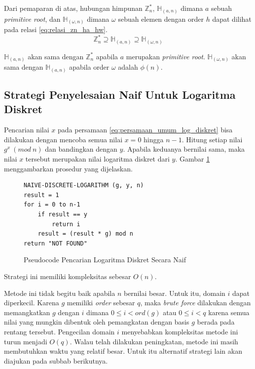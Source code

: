 Dari pemaparan di atas, hubungan himpunan $ \mathbb{Z}_n^* $, $ \mathbb{H}_{(a, n)} $ dimana $ a $ sebuah \textit{primitive root}, dan $ \mathbb{H}_{(\omega, n)} $ dimana $ \omega $ sebuah elemen dengan order $ h $ dapat dilihat pada relasi \eqref{eq:relasi_zn_ha_hw}.
\begin{equation}
\mathbb{Z}_n^*\supseteq \mathbb{H}_{(a, n)} \supseteq \mathbb{H}_{(\omega, n)}
\label{eq:relasi_zn_ha_hw}
\end{equation}

$ \mathbb{H}_{(a, n)} $ akan sama dengan $ \mathbb{Z}_n^* $ apabila $ a $ merupakan \textit{primitive root}. $ \mathbb{H}_{(\omega, n)} $ akan sama dengan $ \mathbb{H}_{(a, n)} $ apabila order $ {\omega} $ adalah $ \phi(n) $.

\subsection{Strategi Penyelesaian Naif Untuk Logaritma Diskret}
Pencarian nilai $ x $ pada persamaan \eqref{eq:persamaan_umum_log_diskret} bisa dilakukan dengan mencoba semua nilai $ x = 0 $ hingga $ n-1 $. Hitung setiap nilai $ g^x\ (mod\ n) $ dan bandingkan dengan $ y $. Apabila keduanya bernilai sama, maka nilai $ x $ tersebut merupakan nilai logaritma diskret dari $ y $. Gambar \ref{psdo:disc_log_naive} menggambarkan prosedur yang dijelaskan.
\begin{figure}[h!]
\begin{lstlisting}[firstnumber=0]
NAIVE-DISCRETE-LOGARITHM (g, y, n)
result = 1
for i = 0 to n-1
	if result == y
		return i
	result = (result * g) mod n
return "NOT FOUND"
\end{lstlisting}
\caption{Pseudocode Pencarian Logaritma Diskret Secara Naif}
\label{psdo:disc_log_naive}
\end{figure}
Strategi ini memiliki kompleksitas sebesar $ O(n) $.

Metode ini tidak begitu baik apabila $ n $ bernilai besar. Untuk itu, domain $ i $ dapat diperkecil. Karena $ g $ memiliki \textit{order} sebesar $ q $, maka \textit{brute force} dilakukan dengan memangkatkan $ g $ dengan $ i $ dimana $ 0\leq i < ord(g) $ atau $ 0 \leq i < q $ karena semua nilai yang mungkin dibentuk oleh pemangkatan dengan basis $ g $ berada pada rentang tersebut. Pengecilan domain $ i $ menyebabkan kompleksitas metode ini turun menjadi $ O(q) $. Walau telah dilakukan peningkatan, metode ini masih membutuhkan waktu yang relatif besar. Untuk itu alternatif strategi lain akan diajukan pada subbab berikutnya.

